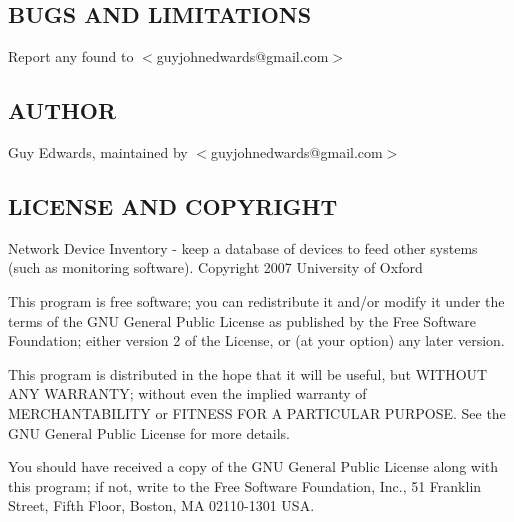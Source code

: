 \documentclass{book}
\begin{document}
\subsection{BUGS AND LIMITATIONS}
\label{Inventory::Manufacturers_BUGS_AND_LIMITATIONS}
\hypertarget{Inventory::Manufacturers_BUGS_AND_LIMITATIONS}{}



Report any found to $<$guyjohnedwards@gmail.com$>$


\subsection{AUTHOR}
\label{Inventory::Manufacturers_AUTHOR}
\hypertarget{Inventory::Manufacturers_AUTHOR}{}



Guy Edwards, maintained by $<$guyjohnedwards@gmail.com$>$


\subsection{LICENSE AND COPYRIGHT}
\label{Inventory::Manufacturers_LICENSE_AND_COPYRIGHT}
\hypertarget{Inventory::Manufacturers_LICENSE_AND_COPYRIGHT}{}



Network Device Inventory - keep a database of devices to feed other systems (such as monitoring software). Copyright 2007 University of Oxford



This program is free software; you can redistribute it and/or modify it under the terms of the GNU General Public License as published by the Free Software Foundation; either version 2 of the License, or (at your option) any later version.



This program is distributed in the hope that it will be useful, but WITHOUT ANY WARRANTY; without even the implied warranty of MERCHANTABILITY or FITNESS FOR A PARTICULAR PURPOSE. See the GNU General Public License for more details.



You should have received a copy of the GNU General Public License along with this program; if not, write to the Free Software Foundation, Inc., 51 Franklin Street, Fifth Floor, Boston, MA 02110-1301 USA.
\end{document}
